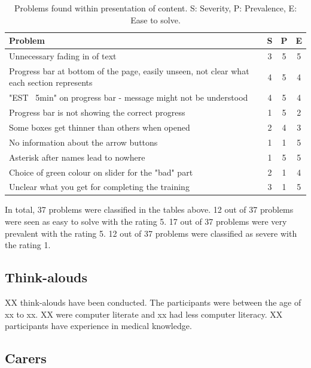 \documentclass{sigchi}
\begin{document}
\begin{table}[H]
    \centering
    \begin{tabular}{|m{6.5cm}|c|c|c|}
    \hline
        \textbf{Problem} & \textbf{S} & \textbf{P} & \textbf{E}\\
    \hline
         Unnecessary fading in of text & 3 & 5 & 5\\
    \hline
         Progress bar at bottom of the page, easily unseen, not clear what each section represents & 4 & 5 & 4\\
    \hline
         "EST ~5min" on progress bar - message might not be understood & 4 & 5 & 4\\
    \hline
         Progress bar is not showing the correct progress & 1 & 5 & 2\\
    \hline
         Some boxes get thinner than others when opened & 2 & 4 & 3\\
    \hline
         No information about the arrow buttons & 1 & 1 & 5\\
    \hline
         Asterisk after names lead to nowhere & 1 & 5 & 5\\
    \hline
         Choice of green colour on slider for the "bad" part & 2 & 1 & 4\\
    \hline
         Unclear what you get for completing the training & 3 & 1 & 5\\
    \hline
    \end{tabular}
    \caption{Problems found within presentation of content. S: Severity, P: Prevalence, E: Ease to solve.}
    \label{tab:content}
\end{table}

In total, 37 problems were classified in the tables above. 12 out of 37 problems were seen as easy to solve with the rating 5. 17 out of 37 problems were very prevalent with the rating 5. 12 out of 37 problems were classified as severe with the rating 1.

\subsection{Think-alouds}
XX think-alouds have been conducted. The participants were between the age of xx to xx. XX were computer literate and xx had less computer literacy. XX participants have experience in medical knowledge. 

\subsection{Carers}
\end{document}
